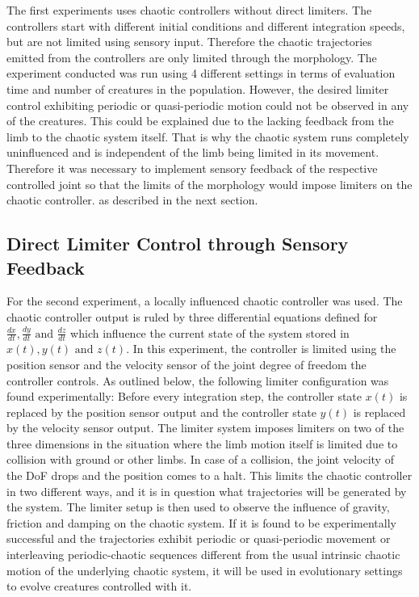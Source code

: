 \documentclass[main]{subfiles}
\begin{document}
The first experiments uses chaotic controllers without direct limiters. %
%
The controllers start with different initial conditions and different integration speeds, but are not limited using sensory input. %
%
Therefore the chaotic trajectories emitted from the controllers are only limited through the morphology. %
%
The experiment conducted was run using 4 different settings in terms of evaluation time and number of creatures in the population. %
%
However, the desired limiter control exhibiting periodic or quasi-periodic motion could not be observed in any of the creatures. %
%
This could be explained due to the lacking feedback from the limb to the chaotic system itself. %
%
That is why the chaotic system runs completely uninfluenced and is independent of the limb being limited in its movement. %
%
Therefore it was necessary to implement sensory feedback of the respective controlled joint so that the limits of the morphology would impose limiters on the chaotic controller. as described in the next section.

\subsection{Direct Limiter Control through Sensory Feedback}

For the second experiment, a locally influenced chaotic controller was used. %
%
The chaotic controller output is ruled by three differential equations defined for \(\frac{dx}{dt},\frac{dy}{dt} \text{ and } \frac{dz}{dt}\) which influence the current state of the system stored in \(x(t),y(t) \text{ and } z(t)\). %
%
In this experiment, the controller is limited using the position sensor and the velocity sensor of the joint degree of freedom the controller controls. %
%
As outlined below, the following limiter configuration was found experimentally: Before every integration step, the controller state \(x(t)\) is replaced by the position sensor output and the controller state \(y(t)\) is replaced by the velocity sensor output. %
%
The limiter system imposes limiters on two of the three dimensions in the situation where the limb motion itself is limited due to collision with ground or other limbs. %
%
In case of a collision, the joint velocity of the DoF drops and the position comes to a halt. %
%
This limits the chaotic controller in two different ways, and it is in question what trajectories will be generated by the system. %
%
The limiter setup is then used to observe the influence of gravity, friction and damping on the chaotic system. %
%
If it is found to be experimentally successful and the trajectories exhibit periodic or quasi-periodic movement or interleaving periodic-chaotic sequences different from the usual intrinsic chaotic motion of the underlying chaotic system, it will be used in evolutionary settings to evolve creatures controlled with it.
\end{document}
